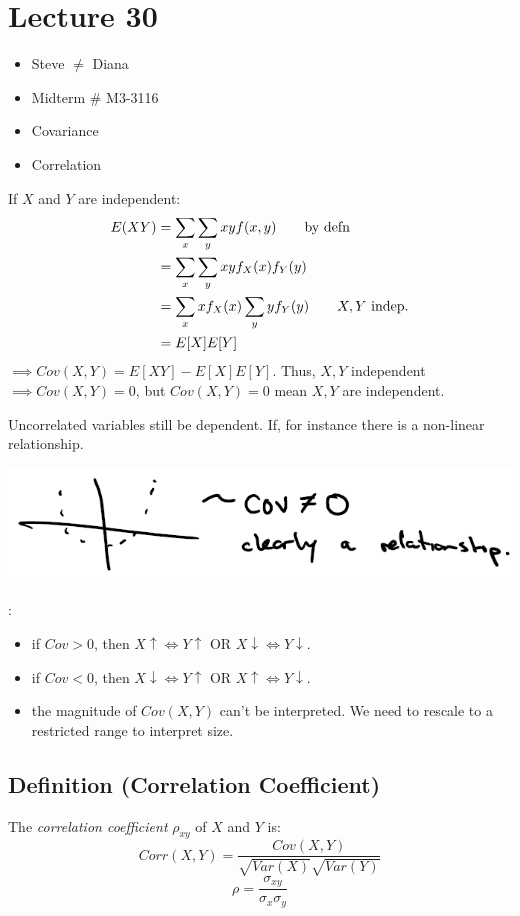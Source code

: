\section{Lecture 30}
\begin{itemize}
    \item Steve $ \neq $ Diana
    \item Midterm \# M3-3116
    \item Covariance
    \item Correlation
\end{itemize}
If $ X $ and $ Y $ are independent:
\begin{align*}
    E(XY)&=
    \sum\limits_{x} \sum\limits_{y} x y f(x,y)\qquad\text{by defn}\\
    &= \sum\limits_{x} \sum\limits_{y} x y f
_X(x)f_Y(y)\\
    &=\sum\limits_{x} x f
_X(x) \sum\limits_{y} y f
_Y(y)\qquad\text{$ X,Y $ indep.}\\
    &=E[X]E[Y]
\end{align*}
$ \implies Cov(X,Y)=E[XY]-E[X]E[Y] $. Thus, $ X,Y $ independent
$ \implies Cov(X,Y)=0 $, but $ Cov(X,Y) = 0 $ 
mean $ X,Y $ are independent.

Uncorrelated variables  still be dependent. If, for
instance there is a non-linear relationship.

\begin{center}
    \includegraphics{covnot0.png}
\end{center}

:
\begin{itemize}
    \item if $ Cov>0 $, then $ X\uparrow \iff Y\uparrow $ OR
    $ X\downarrow \iff Y\downarrow $.
    \item if $ Cov<0 $, then $ X\downarrow \iff Y\uparrow $ OR
    $ X\uparrow \iff Y\downarrow $.
    \item the magnitude of $ Cov(X,Y) $ can't be interpreted. We need
    to rescale to a restricted range to interpret size.
\end{itemize}

\begin{defbox}
    \subsection{Definition (Correlation Coefficient)}
    The \emph{correlation coefficient} $ \rho_{x y} $ of $ X $ and $ Y $ is:
    \[ Corr(X,Y)=\frac{Cov(X,Y)}{\sqrt{Var(X)}\sqrt{Var(Y)}} \]
    \[ \rho=\frac{\sigma_{x y}}{\sigma_x\sigma_y}  \]    
\end{defbox}

